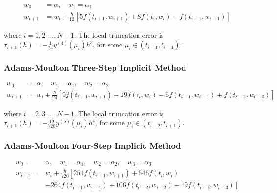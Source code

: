 \begin{equation}\label{eqn:multistepeq17}
\begin{split}
w_{0} & =\alpha, \quad w_{1}=\alpha_{1} \\
w_{i+1} & =w_{i}+\frac{h}{12}\left[5 f\left(t_{i+1}, w_{i+1}\right)+8 f\left(t_{i}, w_{i}\right)-f\left(t_{i-1}, w_{i-1}\right)\right] 
\end{split}
\end{equation}

where $i=1,2, \ldots, N-1$. The local truncation error is $\tau_{i+1}(h)=-\frac{1}{24} y^{(4)}\left(\mu_{i}\right) h^{3}$, for some $\mu_{i} \in\left(t_{i-1}, t_{i+1}\right)$.

\subsubsection*{Adams-Moulton Three-Step Implicit Method}

\begin{equation}\label{eqn:multistepeq18}
\begin{split}
w_{0} & =\alpha, \quad w_{1}=\alpha_{1}, \quad w_{2}=\alpha_{2}  \\
w_{i+1} & =w_{i}+\frac{h}{24}\left[9 f\left(t_{i+1}, w_{i+1}\right)+19 f\left(t_{i}, w_{i}\right)-5 f\left(t_{i-1}, w_{i-1}\right)+f\left(t_{i-2}, w_{i-2}\right)\right]
\end{split}
\end{equation}

where $i=2,3, \ldots, N-1$. The local truncation error is $\tau_{i+1}(h)=-\frac{19}{720} y^{(5)}\left(\mu_{i}\right) h^{4}$, for some $\mu_{i} \in\left(t_{i-2}, t_{i+1}\right)$.

\subsubsection*{Adams-Moulton Four-Step Implicit Method}

\begin{equation}\label{eqn:multistepeq19}
\begin{split}
w_{0}= & \alpha, \quad w_{1}=\alpha_{1}, \quad w_{2}=\alpha_{2}, \quad w_{3}=\alpha_{3} \\
w_{i+1}= & w_{i}+\frac{h}{720}\left[251 f\left(t_{i+1}, w_{i+1}\right)+646 f\left(t_{i}, w_{i}\right)\right.\\
& \left.-264 f\left(t_{i-1}, w_{i-1}\right)+106 f\left(t_{i-2}, w_{i-2}\right)-19 f\left(t_{i-3}, w_{i-3}\right)\right]
\end{split}
\end{equation}

